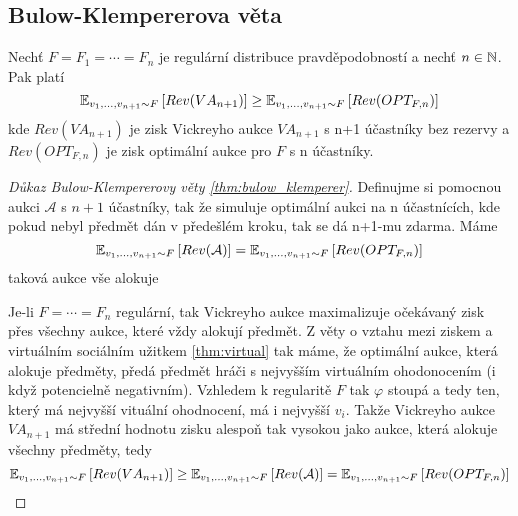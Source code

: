 \subsection{Bulow-Klempererova věta}

\begin{theorem}
\label{thm:bulow_klemperer}
Nechť $F = F_1 = \cdots = F_n$ je regulární distribuce pravděpodobností a nechť $n \in \N$. 
Pak platí 
\[
    \E[v_1,\dots,v_{n+1}\sim F]{Rev(VA_{n+1})} \geq \E[v_1,\dots,v_{n+1}\sim F]{Rev(OPT_{F,n})} 
\]
kde $Rev(VA_{n+1})$ je zisk Vickreyho aukce $VA_{n+1}$ s n+1 účastníky bez rezervy a $Rev(OPT_{F,n})$ je zisk optimální aukce pro $F$ s n účastníky. 
\end{theorem}
\begin{proof}[Důkaz Bulow-Klempererovy věty \ref{thm:bulow_klemperer}]
    Definujme si pomocnou aukci $\mathcal{A}$ s $n+1$ účastníky, tak že simuluje optimální aukci na n účastnících, kde pokud nebyl předmět dán v předešlém kroku, tak se dá n+1-mu zdarma. 
    Máme 
    \[
        \E[v_1,\dots,v_{n+1}\sim F]{Rev(\mathcal{A})} = \E[v_1,\dots,v_{n+1}\sim F]{Rev(OPT_{F,n})}
    \]
    taková aukce vše alokuje

    Je-li $F=\cdots=F_n$ regulární, tak Vickreyho aukce maximalizuje očekávaný zisk přes všechny aukce, které vždy alokují předmět. 
    Z věty o vztahu mezi ziskem a virtuálním sociálním užitkem \ref{thm:virtual} tak máme, že optimální aukce, která alokuje předměty, předá předmět hráči s nejvyšším virtuálním ohodonocením (i když potencielně negativním). 
    Vzhledem k regularitě $F$ tak $\varphi$ stoupá a tedy ten, který má nejvyšší vituální ohodnocení, má i nejvyšší $v_i$. 
    Takže Vickreyho aukce $VA_{n+1}$ má střední hodnotu zisku alespoň tak vysokou jako aukce, která alokuje všechny předměty, tedy 
    \[
        \E[v_1,\dots,v_{n+1}\sim F]{Rev(VA_{n+1})} \geq \E[v_1,\dots,v_{n+1}\sim F]{Rev(\mathcal{A})} = \E[v_1,\dots,v_{n+1}\sim F]{Rev(OPT_{F,n})}
    \]
\end{proof}

